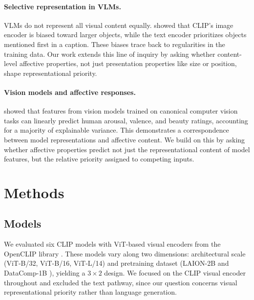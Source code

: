 \documentclass[12pt]{article}
\begin{document}
\paragraph{Selective representation in VLMs.}
VLMs do not represent all visual content equally. \citet{abbasiCLIPMicroscopeFineGrained2025} showed that CLIP's image encoder is biased toward larger objects, while the text encoder prioritizes objects mentioned first in a caption. These biases trace back to regularities in the training data. Our work extends this line of inquiry by asking whether content-level affective properties, not just presentation properties like size or position, shape representational priority.

\paragraph{Vision models and affective responses.}
\citet{conwellPerceptualPrimacyFeeling2025} showed that features from vision models trained on canonical computer vision tasks can linearly predict human arousal, valence, and beauty ratings, accounting for a majority of explainable variance. This demonstrates a correspondence between model representations and affective content. We build on this by asking whether affective properties predict not just the representational content of model features, but the relative priority assigned to competing inputs.

\section{Methods}

\subsection{Models}

We evaluated six CLIP models with ViT-based visual encoders from the OpenCLIP library \citep{cherti2023reproducible, ilharco_gabriel_openclip_repo}. These models vary along two dimensions: architectural scale (ViT-B/32, ViT-B/16, ViT-L/14) and pretraining dataset (LAION-2B \citep{schuhmann2022laion5bopenlargescaledataset} and DataComp-1B \citep{gadre2023datacompsearchgenerationmultimodal}), yielding a $3 \times 2$ design. We focused on the CLIP visual encoder throughout and excluded the text pathway, since our question concerns visual representational priority rather than language generation.
\end{document}

